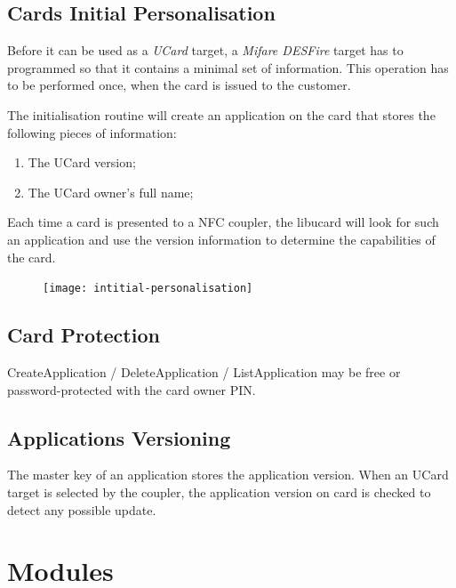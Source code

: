 \documentclass{article}
\begin{document}
\subsection{Cards Initial Personalisation}

Before it can be used as a \emph{UCard} target, a \emph{Mifare
DESFire} target has to programmed so that it contains a minimal set of
information.  This operation has to be performed once, when the card is
issued to the customer.


The initialisation routine will create an application on the card that
stores the following pieces of information:

\begin{enumerate}
  \item The UCard version;
	\item The UCard owner's full name;
\end{enumerate}

Each time a card is presented to a NFC coupler, the libucard will look
for such an application and use the version information to determine
	the capabilities of the card.

\begin{figure}[htp]
  \centering
  \texttt{[image: intitial-personalisation]}
\end{figure}

\subsection{Card Protection}

CreateApplication / DeleteApplication / ListApplication may be free or
password-protected with the card owner PIN.


\subsection{Applications Versioning}

The master key of an application stores the application version.
When an UCard target is selected by the coupler, the application
version on card is checked to detect any possible update.

\section{Modules}
\end{document}
